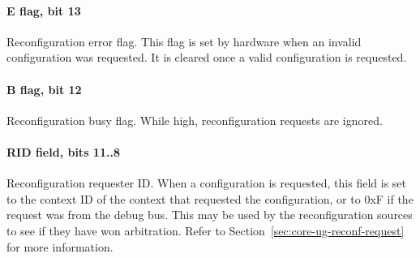 \paragraph*{E flag, bit 13}
Reconfiguration error flag. This flag is set by hardware when an invalid
configuration was requested. It is cleared once a valid configuration is
requested.
\paragraph*{B flag, bit 12}
Reconfiguration busy flag. While high, reconfiguration requests are ignored.
\paragraph*{RID field, bits 11..8}
Reconfiguration requester ID. When a configuration is requested, this field is
set to the context ID of the context that requested the configuration, or to
0xF if the request was from the debug bus. This may be used by the
reconfiguration sources to see if they have won arbitration. Refer to
Section~\ref{sec:core-ug-reconf-request} for more information.
